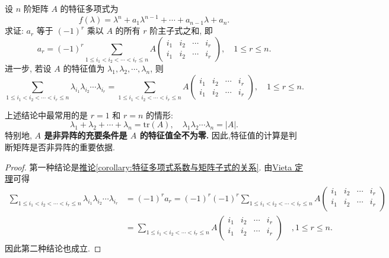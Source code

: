 \documentclass[../../main.tex]{subfiles}%
\begin{document}
\begin{proposition}[特征值与特征多项式系数的关系]\label{proposition:特征值与特征多项式系数的关系}
设 $n$ 阶矩阵 $A$ 的特征多项式为
\[
f(\lambda) = \lambda^n + a_1 \lambda^{n-1} + \cdots + a_{n-1} \lambda + a_n.
\]
求证: $a_r$ 等于 $(-1)^r$ 乘以 $A$ 的所有 $r$ 阶主子式之和, 即
\[
a_r = (-1)^r \sum_{1 \leqslant  i_1 < i_2 < \cdots < i_r \leqslant  n}  A
\begin{pmatrix}
i_1 & i_2 & \cdots & i_r \\
i_1 & i_2 & \cdots & i_r
\end{pmatrix}, \quad 1 \leqslant  r \leqslant  n.
\]
进一步, 若设 $A$ 的特征值为 $\lambda_1, \lambda_2, \cdots, \lambda_n$, 则
\[
\sum_{1 \leqslant  i_1 < i_2 < \cdots < i_r \leqslant  n} \lambda_{i_1} \lambda_{i_2} \cdots \lambda_{i_r} = \sum_{1 \leqslant  i_1 < i_2 < \cdots < i_r \leqslant  n} A
\begin{pmatrix}
i_1 & i_2 & \cdots & i_r \\
i_1 & i_2 & \cdots & i_r
\end{pmatrix}, \quad 1 \leqslant  r \leqslant  n.
\]
\end{proposition}
\begin{remark}
上述结论中最常用的是 $r = 1$ 和 $r = n$ 的情形:
\[
\lambda_1 + \lambda_2 + \cdots + \lambda_n = \mathrm{tr}(A), \quad \lambda_1 \lambda_2 \cdots \lambda_n = |A|.
\]
特别地,\textbf{ $A$ 是非异阵的充要条件是 $A$ 的特征值全不为零.} 因此,特征值的计算是判断矩阵是否非异阵的重要依据.
\end{remark}
\begin{proof}

第一种结论是\hyperref[corollary:特征多项式系数与矩阵子式的关系]{推论\ref{corollary:特征多项式系数与矩阵子式的关系}}. 
由\hyperref[theorem:Vieta定理]{Vieta 定理}可得
\begin{align*}
\sum_{1\leqslant i_1<i_2<\cdots <i_r\leqslant n}{\lambda _{i_1}\lambda _{i_2}}\cdots \lambda _{i_r}&=\left( -1 \right) ^ra_r=\left( -1 \right) ^r\left( -1 \right) ^r\sum_{1\leqslant i_1<i_2<\cdots <i_r\leqslant n}{A\left( \begin{matrix}
i_1&		i_2&		\cdots&		i_r\\
i_1&		i_2&		\cdots&		i_r\\
\end{matrix} \right)}
\\
&=\sum_{1\leqslant i_1<i_2<\cdots <i_r\leqslant n}{A\left( \begin{matrix}
i_1&		i_2&		\cdots&		i_r\\
i_1&		i_2&		\cdots&		i_r\\
\end{matrix} \right)}\quad ,1\leqslant r\leqslant n.
\end{align*}
因此第二种结论也成立.

\end{proof}
\end{document}
